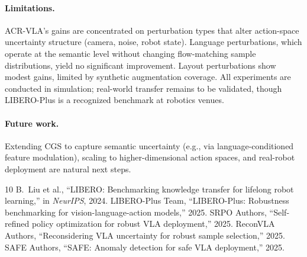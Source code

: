 \documentclass[letterpaper]{article}
\begin{document}
\paragraph{Limitations.}
ACR-VLA's gains are concentrated on perturbation types that alter action-space uncertainty structure (camera, noise, robot state).
Language perturbations, which operate at the semantic level without changing flow-matching sample distributions, yield no significant improvement.
Layout perturbations show modest gains, limited by synthetic augmentation coverage.
All experiments are conducted in simulation; real-world transfer remains to be validated, though LIBERO-Plus is a recognized benchmark at robotics venues.

\paragraph{Future work.}
Extending CGS to capture semantic uncertainty (e.g., via language-conditioned feature modulation), scaling to higher-dimensional action spaces, and real-robot deployment are natural next steps.


\begin{thebibliography}{10}
 B.~Liu et al., ``LIBERO: Benchmarking knowledge transfer for lifelong robot learning,'' in \emph{NeurIPS}, 2024.
 LIBERO-Plus Team, ``LIBERO-Plus: Robustness benchmarking for vision-language-action models,'' 2025.
 SRPO Authors, ``Self-refined policy optimization for robust VLA deployment,'' 2025.
 ReconVLA Authors, ``Reconsidering VLA uncertainty for robust sample selection,'' 2025.
 SAFE Authors, ``SAFE: Anomaly detection for safe VLA deployment,'' 2025.
\end{thebibliography}
\end{document}
